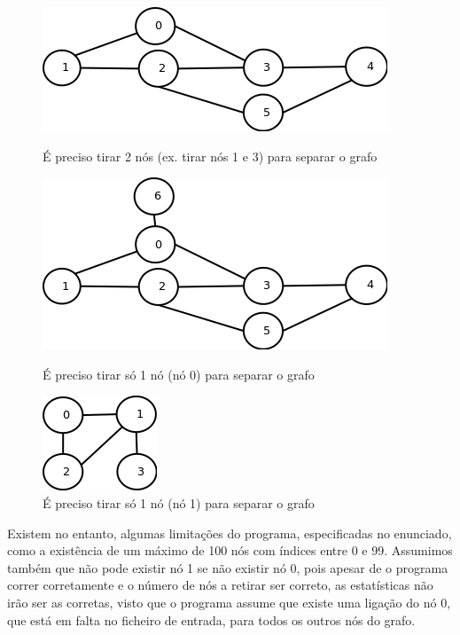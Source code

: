\documentclass[a4paper]{article}
\begin{document}
\begin{figure}[!htb]
   \includegraphics[width=\textwidth]{esquesito.png}
    \caption{É preciso tirar 2 nós (ex. tirar nós 1 e 3) para separar o grafo}
\endminipage\hfill
{}
   \includegraphics[width=\textwidth]{esquesito1.png}
    \caption{É preciso tirar só 1 nó (nó 0) para separar o grafo}
\endminipage\hfill
{}%
  \includegraphics[scale=0.3]{grafo_pequeno.png}
  \caption{É preciso tirar só 1 nó (nó 1) para separar o grafo}
\endminipage
\end{figure}

Existem no entanto, algumas limitações do programa, especificadas no enunciado, como a existência de um máximo de 100 nós com índices entre 0 e 99. Assumimos também que não pode existir nó 1 se não existir nó 0, pois apesar de o programa correr corretamente e o número de nós a retirar ser correto, as estatísticas não irão ser as corretas, visto que o programa assume que existe uma ligação do nó 0, que está em falta no ficheiro de entrada, para todos os outros nós do grafo.
\end{document}

